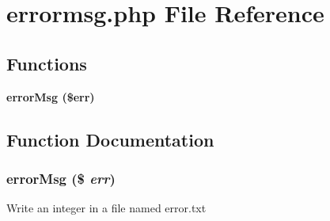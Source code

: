 \section{errormsg.php File Reference}
\label{errormsg_8php}


\subsection*{Functions}
\begin{CompactItemize}
\item 
\bf{error\-Msg} (\$err)
\end{CompactItemize}


\subsection{Function Documentation}
\subsubsection{\setlength{\rightskip}{0pt plus 5cm}error\-Msg (\$ {\em err})}\label{errormsg_8php_3785b2eb145621e903ce02f59695a38e}


Write an integer in a file named error.txt 